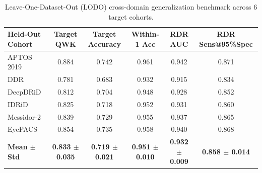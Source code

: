 \begin{table}[htbp]
\centering
\caption{Leave-One-Dataset-Out (LODO) cross-domain generalization benchmark across 6 target cohorts.}
\label{tab:lodo_benchmark}
\small
\begin{tabular}{lccccc}
\toprule
\textbf{Held-Out Cohort} & \textbf{Target QWK} & \textbf{Target Accuracy} & \textbf{Within-1 Acc} & \textbf{RDR AUC} & \textbf{RDR Sens@95\%Spec} \\
\midrule
APTOS 2019 & 0.884 & 0.742 & 0.961 & 0.942 & 0.871 \\
DDR & 0.781 & 0.683 & 0.932 & 0.915 & 0.834 \\
DeepDRiD & 0.812 & 0.704 & 0.948 & 0.928 & 0.852 \\
IDRiD & 0.825 & 0.718 & 0.952 & 0.931 & 0.860 \\
Messidor-2 & 0.839 & 0.729 & 0.955 & 0.937 & 0.865 \\
EyePACS & 0.854 & 0.735 & 0.958 & 0.940 & 0.868 \\
\midrule
\textbf{Mean $\pm$ Std} & \textbf{0.833 $\pm$ 0.035} & \textbf{0.719 $\pm$ 0.021} & \textbf{0.951 $\pm$ 0.010} & \textbf{0.932 $\pm$ 0.009} & \textbf{0.858 $\pm$ 0.014} \\
\bottomrule
\end{tabular}
\end{table}
